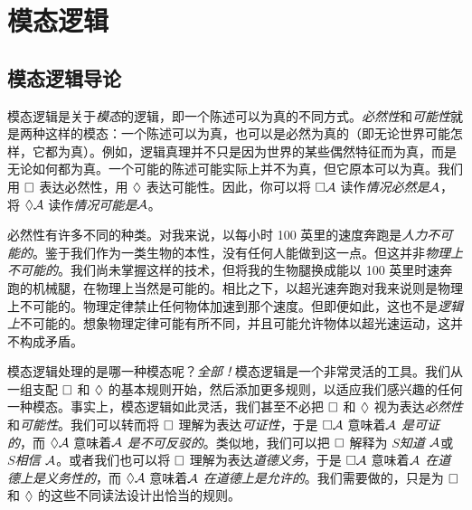 
\part{模态逻辑}
\label{ch.ML}

\chapter{模态逻辑导论}
\label{Intro}

模态逻辑是关于\emph{模态}的逻辑，即一个陈述可以为真的不同方式。\emph{必然性}和\emph{可能性}就是两种这样的模态：一个陈述可以为真，也可以是必然为真的（即无论世界可能怎样，它都为真）。例如，逻辑真理并不只是因为世界的某些偶然特征而为真，而是无论如何都为真。一个可能的陈述可能实际上并不为真，但它原本可以为真。我们用 $\Box$ 表达必然性，用 $\Diamond$ 表达可能性。因此，你可以将 $\Box \mathcal{A}$ 读作\emph{情况必然是}$\mathcal{A}$，将 $\Diamond \mathcal{A}$ 读作\emph{情况可能是}$\mathcal{A}$。

必然性有许多不同的种类。对我来说，以每小时 100 英里的速度奔跑是\emph{人力不可能的}。鉴于我们作为一类生物的本性，没有任何人能做到这一点。但这并非\emph{物理上不可能的}。我们尚未掌握这样的技术，但将我的生物腿换成能以 100 英里时速奔跑的机械腿，在物理上当然是可能的。相比之下，以超光速奔跑对我来说则是物理上不可能的。物理定律禁止任何物体加速到那个速度。但即便如此，这也不是\emph{逻辑上}不可能的。想象物理定律可能有所不同，并且可能允许物体以超光速运动，这并不构成矛盾。

模态逻辑处理的是哪一种模态呢？\emph{全部！}模态逻辑是一个非常灵活的工具。我们从一组支配 $\Box$ 和 $\Diamond$ 的基本规则开始，然后添加更多规则，以适应我们感兴趣的任何一种模态。事实上，模态逻辑如此灵活，我们甚至不必把 $\Box$ 和 $\Diamond$ 视为表达\emph{必然性}和\emph{可能性}。我们可以转而将 $\Box$ 理解为表达\emph{可证性}，于是 $\Box\mathcal{A}$ 意味着\emph{$\mathcal{A}$ 是可证的}，而 $\Diamond\mathcal{A}$ 意味着\emph{$\mathcal{A}$ 是不可反驳的}。类似地，我们可以把 $\Box$ 解释为 $S$\emph{知道 $\mathcal{A}$}或 $S$\emph{相信 $\mathcal{A}$}。或者我们也可以将 $\Box$ 理解为表达\emph{道德义务}，于是 $\Box \mathcal{A}$ 意味着\emph{$\mathcal{A}$ 在道德上是义务性的}，而 $\Diamond \mathcal{A}$ 意味着\emph{$\mathcal{A}$ 在道德上是允许的}。我们需要做的，只是为 $\Box$ 和 $\Diamond$ 的这些不同读法设计出恰当的规则。

